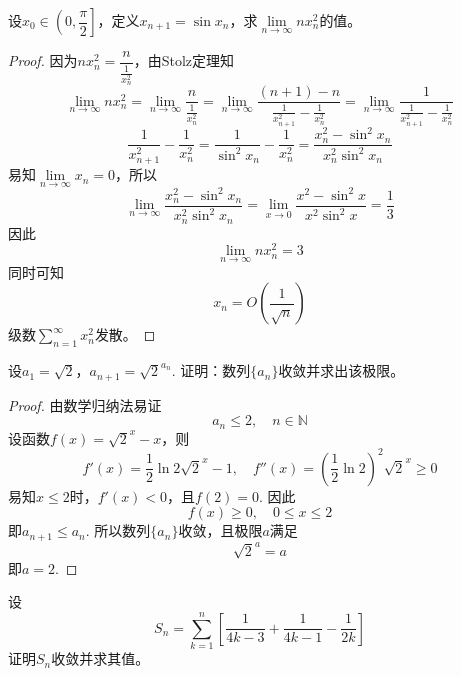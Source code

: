 \begin{proposition}

    设$x_0 \in \left( 0, \dfrac{\pi}{2} \right]$，定义$x_{n + 1} = \sin{x_n}$，求$\lim\limits_{n \to\infty}{nx_n^2}$的值。

\end{proposition}

\begin{proof}

    因为$nx_n^2 = \dfrac{n}{\frac{1}{x_n^2}}$，由\textup{Stolz}定理知
    \[\lim\limits_{n \to\infty}{nx_n^2} = \lim\limits_{n \to \infty}{\dfrac{n}{\frac{1}{x_n^2}}} = \lim\limits_{n \to \infty}{\dfrac{(n + 1) - n}{\frac{1}{x_{n + 1}^2} - \frac{1}{x_n^2}}} = \lim\limits_{n \to \infty}{\dfrac{1}{\frac{1}{x_{n + 1}^2} - \frac{1}{x_n^2}}}\]
    \[\dfrac{1}{x_{n + 1}^2} - \dfrac{1}{x_n^2} = \dfrac{1}{\sin^2{x_n}} - \dfrac{1}{x_n^2} = \dfrac{x_n^2 - \sin^2{x_n}}{x_n^2 \sin^2{x_n}}\]
    易知$\lim\limits_{n \to \infty}{x_n} = 0$，所以
    \[\lim\limits_{n \to \infty}{\dfrac{x_n^2 - \sin^2{x_n}}{x_n^2 \sin^2{x_n}}} = \lim\limits_{x \to 0}{\dfrac{x^2 - \sin^2{x}}{x^2 \sin^2{x}}} = \dfrac{1}{3}\]
    因此
    \[\lim\limits_{n \to\infty}{nx_n^2} = 3\]
    同时可知
    \[x_n = O\left( \dfrac{1}{\sqrt{n}} \right)\]
    级数$\sum\limits_{n = 1}^{\infty}{x_n^2}$发散。

\end{proof}

\begin{proposition}

    设$a_1 = \sqrt{2}$，$a_{n + 1} = {\sqrt{2}}^{a_n}$. 证明：数列$\{a_n\}$收敛并求出该极限。

\end{proposition}

\begin{proof}

    由数学归纳法易证
    \[a_n \leq 2, \quad n \in \mathbb{N}\]
    设函数$f(x) = {\sqrt{2}}^x - x$，则
    \[f'(x) = \dfrac{1}{2}\ln2 {\sqrt{2}}^x - 1, \quad f''(x) = \left( \dfrac{1}{2}\ln 2 \right)^2 {\sqrt{2}}^x \geq 0\]
    易知$x \leq 2$时，$f'(x) < 0$，且$f(2) = 0$. 因此
    \[f(x) \geq 0, \quad 0 \leq x \leq 2\]
    即$a_{n + 1} \leq a_n$. 所以数列$\{a_n\}$收敛，且极限$a$满足
    \[{\sqrt{2}}^{a} = a\]
    即$a = 2$.

\end{proof}

\begin{proposition}

    设\[S_{n} = \sum\limits_{k = 1}^{n} \left[ \dfrac{1}{4k - 3} + \dfrac{1}{4k - 1} - \dfrac{1}{2k} \right]\]
    证明$S_{n}$收敛并求其值。

\end{proposition}

